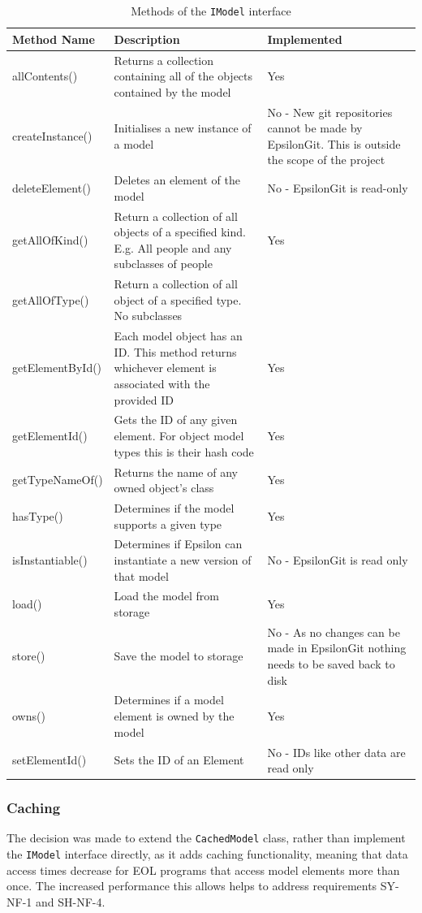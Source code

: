 \documentclass[11pt]{book}
\newcommand{\code}[1]{\texttt{#1}}
\begin{document}
\begin{table}[H]
\centering
\begin{longtable}{|p{3cm}|p{6.5cm}|p{5.5cm}|}
\hline
\textbf{Method Name} & \textbf{Description} & \textbf{Implemented} \\ \hline
allContents() & Returns a collection containing all of the objects contained by the model & Yes \\ \hline
createInstance() & Initialises a new instance of a model & No - New git repositories cannot be made by EpsilonGit. This is outside the scope of the project \\ \hline
deleteElement() & Deletes an element of the model & No - EpsilonGit is read-only \\ \hline
getAllOfKind() & Return a collection of all objects of a specified kind. E.g. All people and any subclasses of people & Yes \\ \hline
getAllOfType() & Return a collection of all object of a specified type. No subclasses &  \\ \hline
getElementById() & Each model object has an ID. This method returns whichever element is associated with the provided ID & Yes \\ \hline
getElementId() & Gets the ID of any given element. For object model types this is their hash code & Yes  \\ \hline
getTypeNameOf() & Returns the name of any owned object's class & Yes \\ \hline
hasType() & Determines if the model supports a given type & Yes \\ \hline
isInstantiable() & Determines if Epsilon can instantiate a new version of that model & No - EpsilonGit is read only \\ \hline
load() & Load the model from storage & Yes \\ \hline
store() & Save the model to storage & No - As no changes can be made in EpsilonGit nothing needs to be saved back to disk \\ \hline
owns() & Determines if a model element is owned by the model & Yes \\ \hline
setElementId() & Sets the ID of an Element & No - IDs like other data are read only \\ \hline
\end{longtable}
\caption{Methods of the \code{IModel} interface \cite{imodeljavadoc}}
\label{tab:imodel}
\end{table}

\subsubsection{Caching}
\label{caching}
The decision was made to extend the \code{CachedModel} class, rather than implement the \code{IModel} interface directly, as it adds caching functionality, meaning that data access times decrease for EOL programs that access model elements more than once. The increased performance this allows helps to address requirements SY-NF-1 and SH-NF-4. \\
\end{document}
